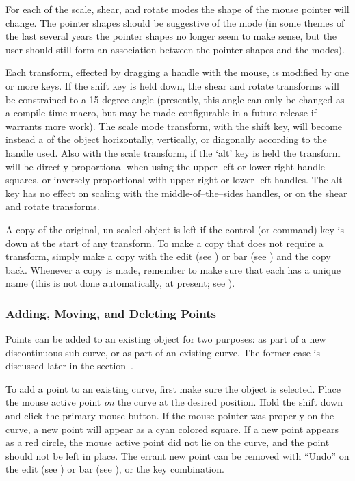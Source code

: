 			For each of the
			scale, shear, and rotate modes the shape of the
			mouse pointer will change. The pointer shapes
			should be suggestive of the mode (in some
			 themes of the last several years the
			pointer shapes no longer seem to make sense, but the
			user should still form an association between the
			pointer shapes and the modes).
			
			Each transform, effected by dragging a handle with the
			mouse, is modified by one or more keys.	If the shift
			key is held down, the shear and rotate transforms
			will be constrained to a 15 degree angle (presently,
			this angle can only be changed as a compile-time
			macro, but may be made configurable
			in a future release if \IXpkg{} warrants more work).
			The scale mode transform, with the shift key, will become
			instead a  of the object horizontally,
			vertically, or diagonally according to the handle
			used. Also with the scale transform, if the `alt'
			key is held the transform will be directly proportional
			when using the upper-left or lower-right handle-squares,
			or inversely proportional with upper-right or
			lower left handles. The alt key has no effect on
			scaling with the middle-of--the--sides handles, or on
			the shear and rotate transforms.
			
			A copy of the original, un-scaled object is left
			if the control (or command) key is down
			at the start of any transform. To make a copy that
			does not require a transform, simply make a
			 copy with the edit 
			(see ) or  bar
			(see ) and
			 the copy back. Whenever a copy is
			made, remember to make sure that each has a unique
			name (this is not done automatically, at present;
			see ).
			
			\subsubsection{Adding, Moving, and Deleting Points}%
			\label{sssec:add_del_points}
			Points can be added to an existing object
			for two purposes:
			as part of a new discontinuous sub-curve, or as
			part of an existing curve. The former case is
			discussed later in the
			section~.
			
			To add a point to an existing curve, first make sure
			the object is selected. Place the mouse active point
			\emph{on} the curve at the desired position.
			Hold the shift  down and click the
			primary mouse button. If the mouse pointer was
			properly on the curve, a new point will appear as a
			cyan colored square. If a new point appears as
			a red circle, the mouse active point did not lie on the
			curve, and the point should not be left in place.
			The errant new point can be removed with
			``Undo'' on the edit 
			(see ) or  bar
			(see ),
			or the  key combination.
			
